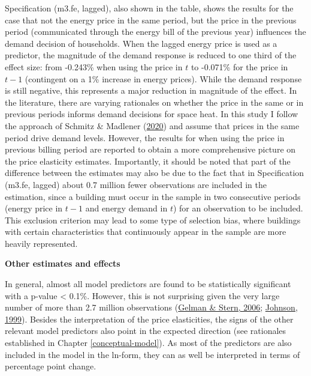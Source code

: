 \documentclass[12pt,twoside]{reedthesis}
\begin{document}
Specification (m3.fe, lagged), also shown in the table, shows the results for the case that not the energy price in the same period, but the price in the previous period (communicated through the energy bill of the previous year) influences the demand decision of households. When the lagged energy price is used as a predictor, the magnitude of the demand response is reduced to one third of the effect size: from -0.243\% when using the price in \(t\) to -0.071\% for the price in \(t-1\) (contingent on a 1\% increase in energy prices). While the demand response is still negative, this represents a major reduction in magnitude of the effect. In the literature, there are varying rationales on whether the price in the same or in previous periods informs demand decisions for space heat. In this study I follow the approach of Schmitz \& Madlener (\protect\hyperlink{ref-schmitz_madlener20}{2020}) and assume that prices in the same period drive demand levels. However, the results for when using the price in previous billing period are reported to obtain a more comprehensive picture on the price elasticity estimates. Importantly, it should be noted that part of the difference between the estimates may also be due to the fact that in Specification (m3.fe, lagged) about 0.7 million fewer observations are included in the estimation, since a building must occur in the sample in two consecutive periods (energy price in \(t-1\) and energy demand in \(t\)) for an observation to be included. This exclusion criterion may lead to some type of selection bias, where buildings with certain characteristics that continuously appear in the sample are more heavily represented.

\textbf{Other estimates and effects}

In general, almost all model predictors are found to be statistically significant with a p-value \textless{} 0.1\%. However, this is not surprising given the very large number of more than 2.7 million observations (\protect\hyperlink{ref-gelman_stern06}{Gelman \& Stern, 2006}; \protect\hyperlink{ref-johnson99}{Johnson, 1999}). Besides the interpretation of the price elasticities, the signs of the other relevant model predictors also point in the expected direction (see rationales established in Chapter \ref{conceptual-model}). As most of the predictors are also included in the model in the ln-form, they can as well be interpreted in terms of percentage point change.
\end{document}
